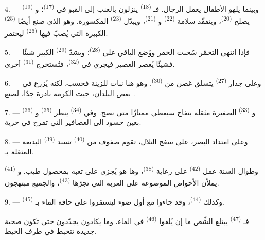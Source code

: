 4. --- وبينما يلهو الأطفال يعمل الرجال. فـ
\textsuperscript{(18)} ينزلون بالعنب إلى القبو في 
\textsuperscript{(17)}؛ و \textsuperscript{(19)} يصلح
 \textsuperscript{(20)}، ويتفقّد سلامة 
\textsuperscript{(22)} و \textsuperscript{(21)}، ويبدّل
 \textsuperscript{(23)} المكسورة. وهو الذي صنع أيضًا
 \textsuperscript{(25)} الكبيرة التي يُصبّ فيها 
\textsuperscript{(26)} ليختمر.

5. --- فإذا انتهى التخمّر سُحبت الخمر ووُضع الباقي على 
\textsuperscript{(28)}؛ وبشدّ  \textsuperscript{(29)} الكبير شيئًا
فشيئًا يُعصر العصير فيجري في  \textsuperscript{(32)}، فتُستخرج
 \textsuperscript{(31)} أخرى.

\VUsaut{6.0mm}
\VUsaut{3.4mm}

6. --- وعلى جدار  \textsuperscript{(27)} يتسلق غصن من
 \textsuperscript{(30)}. وهو هنا نبات للزينة فحسب، لكنه يُزرع في
بعض البلدان، حيث الكرمة نادرة جدًا، لصنع .

7. --- و \textsuperscript{(33)} الصغيرة مثقلة بتفاح سيعطي
 ممتازًا متى نضج. وفي  \textsuperscript{(34)}
ينظر  \textsuperscript{(35)} و \textsuperscript{(36)}
بعين حسود إلى العصافير التي تمرح في حرية.

8. --- وعلى امتداد البصر، على سفح التلال، تقوم صفوف من  \textsuperscript{(40)} تسند  \textsuperscript{(39)} البديعة
المثقلة بـ.

وطوال السنة عمل  \textsuperscript{(42)} على رعاية 
\textsuperscript{(38)}، وها هو يُجزى على تعبه بمحصول طيب. و
\textsuperscript{(41)} يملأن الأحواض الموضوعة على العربة التي تجرّها
 \textsuperscript{(43)}، والجميع مبتهجون.

\VUsaut{5.0mm}
\VUsaut{3.4mm}

9. --- وكذلك  \textsuperscript{(44)}، وقد جاءوا مع أول
ضوء ليستقروا على حافة الماء بـ \textsuperscript{(45)}.

فـ \textsuperscript{(47)} يبتلع الشِّص ما إن يُلقوا 
\textsuperscript{(46)} في الماء، وما يكادون يجدّدون  حتى تكون
ضحية جديدة تتخبط في طرف الخيط.

